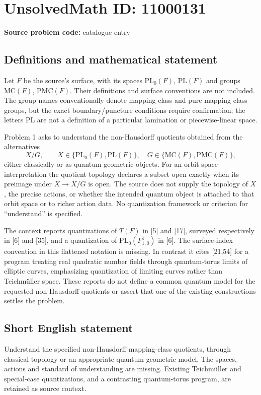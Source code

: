 \documentclass[11pt]{article}
\begin{document}
\section*{UnsolvedMath ID: 11000131}
\textbf{Source problem code:} catalogue entry
\subsection{Definitions and mathematical statement}
Let \(F\) be the source's surface, with its spaces \(\mathrm{PL}_0(F)\), \(\mathrm{PL}(F)\) and groups \(\mathrm{MC}(F)\), \(\mathrm{PMC}(F)\). Their definitions and surface conventions are not included. The group names conventionally denote mapping class and pure mapping class groups, but the exact boundary/puncture conditions require confirmation; the letters PL are not a definition of a particular lamination or piecewise-linear space.

Problem 1 asks to understand the non-Hausdorff quotients obtained from the alternatives
\[
 X/G,\qquad
 X\in\{\mathrm{PL}_0(F),\mathrm{PL}(F)\},\quad
 G\in\{\mathrm{MC}(F),\mathrm{PMC}(F)\},
\]
either classically or as quantum geometric objects. For an orbit-space interpretation the quotient topology declares a subset open exactly when its preimage under \(X\to X/G\) is open. The source does not supply the topology of \(X\), the precise actions, or whether the intended quantum object is attached to that orbit space or to richer action data. No quantization framework or criterion for ``understand'' is specified.

The context reports quantizations of \(T(F)\) in [5] and [17], surveyed respectively in [6] and [35], and a quantization of \(\mathrm{PL}_0(F^1_{1,0})\) in [6]. The surface-index convention in this flattened notation is missing. In contrast it cites [21,54] for a program treating real quadratic number fields through quantum-torus limits of elliptic curves, emphasizing quantization of limiting curves rather than Teichmüller space. These reports do not define a common quantum model for the requested non-Hausdorff quotients or assert that one of the existing constructions settles the problem.
\subsection{Short English statement}
Understand the specified non-Hausdorff mapping-class quotients, through classical topology or an appropriate quantum-geometric model. The spaces, actions and standard of understanding are missing. Existing Teichmüller and special-case quantizations, and a contrasting quantum-torus program, are retained as source context.
\end{document}
